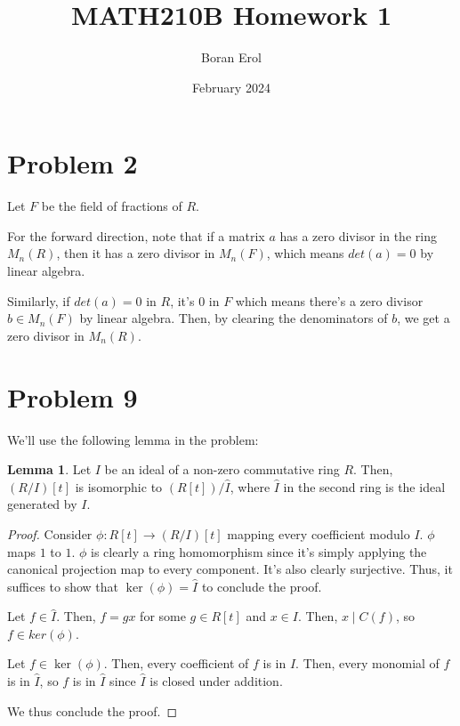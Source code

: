 \documentclass{article}
\title{MATH210B Homework 1}
\date{February 2024}
\author{Boran Erol}
\theoremstyle{definition}
\newtheorem{lemma}[theorem]{Lemma}
\begin{document}
\maketitle

\section{Problem 2}

Let $ F $ be the field of fractions of $ R $.

For the forward direction, note that if a matrix $ a $ has a zero divisor in the ring
$ M_{n}(R) $, then it has a zero divisor in $ M_{n}(F) $, which means $ det(a) = 0 $
by linear algebra.

Similarly, if $ det(a) = 0 $ in $ R $, it's $ 0 $ in $ F $ which means there's a zero
divisor $ b \in M_{n}(F) $ by linear algebra. Then, by clearing the denominators of $ b $,
we get a zero divisor in $ M_{n}(R) $.
 
\section{Problem 9}

We'll use the following lemma in the problem:

\begin{lemma}
    Let $ I $ be an ideal of a non-zero commutative ring $ R $.
    Then, $ (R/I)[t] $ is isomorphic to $ (R[t]) / \hat{I} $,
    where $ \hat{I} $ in the second ring is the ideal generated by $ I $.
\end{lemma}
\begin{proof}
    Consider $ \phi : R[t] \xrightarrow{} (R/I)[t] $ mapping
    every coefficient modulo $ I $. $ \phi $ maps $ 1 $ to $ 1 $.
    $ \phi $ is clearly a ring homomorphism since it's simply applying the canonical
    projection map to every component. It's also clearly surjective. Thus, it suffices to show
    that $ \ker(\phi) = \hat{I} $ to conclude the proof.

    Let $ f \in \hat{I} $. Then, $ f = gx $ for some $ g \in R[t] $ and $ x \in I $.
    Then, $ x \mid C(f) $, so $ f \in ker(\phi) $.

    Let $ f \in \ker(\phi) $. Then, every coefficient of $ f $ is in $ I $.
    Then, every monomial of $ f $ is in $ \hat{I} $, so $ f $ is in $ \hat{I} $ since $ \hat{I} $
    is closed under addition.

    We thus conclude the proof.
\end{proof}
\end{document}
